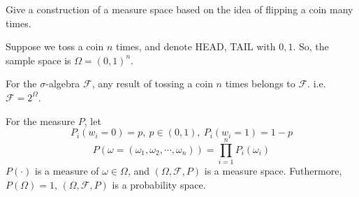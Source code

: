 \documentclass[12pt]{article}
\newenvironment{exercise}[1]{\begin{tcolorbox}[colback=black!15, colframe=black!80, breakable, title=#1]}{\end{tcolorbox}}
\newenvironment{solution}{\begin{tcolorbox}[colback=white, colframe=black!50, breakable, title=Solution. ]\setlength{\parskip}{0.8em}}{\end{tcolorbox}}
\begin{document}
    \begin{exercise}{10}
        Give a construction of a measure space based on the idea of flipping a coin many times. 
    \end{exercise}

    \begin{solution}
        Suppose we toss a coin $n$ times, and denote HEAD, TAIL with $0,1$. So, the sample space is $\Omega=(0,1)^n$. 

        For the $\sigma$-algebra $\mathscr{F}$, any result of tossing a coin $n$ times belongs to $\mathscr{F}$. i.e. $\mathscr{F}=2^\Omega$. 

        For the measure $P$, let 
        \[P_i(w_i=0)=p,\ p\in(0,1),\ P_i(w_i=1)=1-p\]
        \[P(\omega=(\omega_1,\omega_2,\cdots,\omega_n))=\prod_{i=1}^nP_i(\omega_i)\]
        $P(\cdot)$ is a measure of $\omega\in\Omega$, and $(\Omega, \mathscr{F}, P)$ is a measure space. Futhermore, $P(\Omega)=1$, $(\Omega, \mathscr{F}, P)$ is a probability space. 
    \end{solution}

\end{document}
